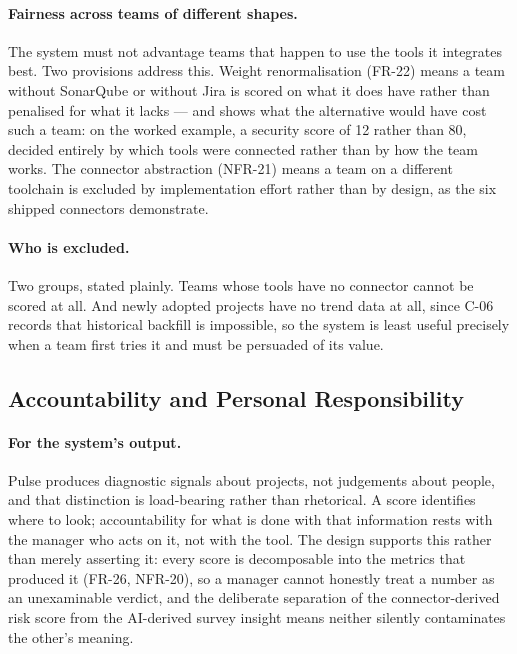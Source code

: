 \paragraph{Fairness across teams of different shapes.} The system must not
advantage teams that happen to use the tools it integrates best. Two provisions
address this. Weight renormalisation (FR-22) means a team without SonarQube or
without Jira is scored on what it does have rather than penalised for what it
lacks --- and  shows what the alternative would have cost such
a team: on the worked example, a security score of 12 rather than 80, decided
entirely by which tools were connected rather than by how the team works. The
connector abstraction (NFR-21) means a team on a different toolchain is excluded
by implementation effort rather than by design, as the six shipped connectors
demonstrate.

\paragraph{Who is excluded.} Two groups, stated plainly. Teams whose tools have
no connector cannot be scored at all. And newly adopted projects have no trend
data at all, since C-06 records that historical backfill is impossible, so the
system is least useful precisely when a team first tries it and must be
persuaded of its value.

\subsection{Accountability and Personal Responsibility}
\label{subsec:accountability}

\paragraph{For the system's output.} Pulse produces diagnostic signals about
projects, not judgements about people, and that distinction is load-bearing
rather than rhetorical. A score identifies where to look; accountability for
what is done with that information rests with the manager who acts on it, not
with the tool. The design supports this rather than merely asserting it: every
score is decomposable into the metrics that produced it (FR-26, NFR-20), so a
manager cannot honestly treat a number as an unexaminable verdict, and the
deliberate separation of the connector-derived risk score from the AI-derived
survey insight means neither silently contaminates the other's meaning.

